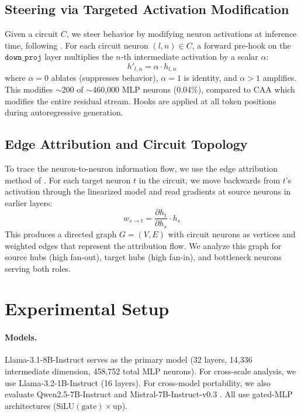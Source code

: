 \documentclass[11pt]{article}
\begin{document}
\subsection{Steering via Targeted Activation Modification}
\label{sec:steering}

Given a circuit $C$, we steer behavior by modifying neuron activations at inference time, following \citet{arora2025circuits}.
For each circuit neuron $(l, n) \in C$, a forward pre-hook on the $\texttt{down\_proj}$ layer multiplies the $n$-th intermediate activation by a scalar $\alpha$:
\begin{equation}
    h'_{l,n} = \alpha \cdot h_{l,n}
\end{equation}
where $\alpha = 0$ ablates (suppresses behavior), $\alpha = 1$ is identity, and $\alpha > 1$ amplifies.
This modifies ${\sim}$200 of ${\sim}$460,000 MLP neurons (0.04\%), compared to CAA which modifies the entire residual stream.
Hooks are applied at all token positions during autoregressive generation.

\subsection{Edge Attribution and Circuit Topology}
\label{sec:edges}

To trace the neuron-to-neuron information flow, we use the edge attribution method of \citet{arora2025circuits}.
For each target neuron $t$ in the circuit, we move backwards from $t$'s activation through the linearized model and read gradients at source neurons in earlier layers:
\begin{equation}
    w_{s \to t} = \frac{\partial h_t}{\partial h_s} \cdot h_s
\end{equation}
This produces a directed graph $G = (V, E)$ with circuit neurons as vertices and weighted edges that represent the attribution flow.
We analyze this graph for source hubs (high fan-out), target hubs (high fan-in), and bottleneck neurons serving both roles.


\section{Experimental Setup}
\label{sec:setup}

\paragraph{Models.}
Llama-3.1-8B-Instruct \citep{dubey2024llama3} serves as the primary model (32 layers, 14,336 intermediate dimension, 458,752 total MLP neurons).
For cross-scale analysis, we use Llama-3.2-1B-Instruct (16 layers).
For cross-model portability, we also evaluate Qwen2.5-7B-Instruct \citep{yang2024qwen2} and Mistral-7B-Instruct-v0.3 \citep{jiang2023mistral}.
All use gated-MLP architectures ($\text{SiLU}(\text{gate}) \times \text{up}$).
\end{document}
